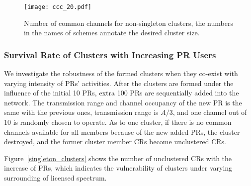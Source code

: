 \begin{figure}[ht!]
  \centering
  \texttt{[image: ccc\_20.pdf]}
  \caption{Number of common channels for non-singleton clusters, the numbers in the names of schemes annotate the desired cluster size.}
  \label{ccc_per_nonsingleton}
\end{figure}

\subsubsection{Survival Rate of Clusters with Increasing PR Users}
We investigate the robustness of the formed clusters when they co-exist with varying intensity of PRs' activities.
After the clusters are formed under the influence of the initial 10 PRs, extra 100 PRs are sequentially added into the network.
The transmission range and channel occupancy of the new PR is the same with the previous ones, \ie transmission range is $A/3$, and one channel out of 10 is randomly chosen to operate.
As to one cluster, if there is no common channels available for all members because of the new added PRs, the cluster destroyed, and the former cluster member CRs become unclustered CRs.

Figure~\ref{singleton_clusters} shows the number of unclustered CRs with the increase of PRs, which indicates the vulnerability of clusters under varying surrounding of licensed spectrum.


